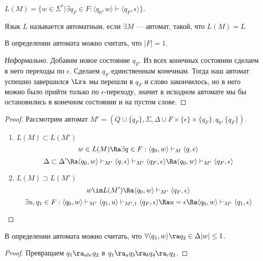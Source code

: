 \begin{definition}
    \(L(M) = \{w \in \Sigma^* | \exists q_F \in F: \langle q_0, w \rangle \vdash \langle q_F, \epsilon \rangle\}\).
\end{definition}

\begin{definition}
    Язык \(L\) называется автоматным, если \(\exists M\) --- автомат, такой, что \(L(M) = L\)
\end{definition}

\begin{proposition}
    В определении автомата можно считать, что \(|F| = 1\).
\end{proposition}
\begin{proof}[Неформально]
    Добавим новое состояние \(q_F\). Из всех конечных состоянии сделаем в него переходы по \(\epsilon\). Сделаем \(q_F\) единственным конечным. Тогда наш автомат успешно завершился \(\Lra\) мы перешли в \(q_F\) и слово закончилось, но в него можно было прийти только по \(\epsilon\)-переходу, значит в исходном автомате мы бы остановились в конечном состоянии и на пустом слове.
\end{proof}
\begin{proof}
    Рассмотрим автомат \(M' = (Q \cup \{q_F\}, \Sigma, \Delta \cup F \times \{\epsilon\} \times \{q_F\}, q_0, \{q_F\})\).
    \begin{enumerate}
        \item \(L(M) \subset L(M')\)
        \[w \in L(M) \Ra \exists q \in F: \langle q_0, w \rangle \vdash_M \langle q, \epsilon \rangle\]
        \[\Delta \subset \Delta' \Ra \langle q_0, w \rangle \vdash_{M'} \langle q, \epsilon \rangle \vdash_{M'} \langle q_F, \epsilon \rangle \Ra \langle q_0, w \rangle \vdash_{M'} \langle q_F, \epsilon \rangle\]
        \item \(L(M) \supset L(M')\)
        \[w \im L(M') \Ra \langle q_0, w\rangle \vdash_{M'} \langle q_F, \epsilon\rangle\]
        \[\exists u, q_1 \in F: \langle q_0, w\rangle \vdash_{M'} \langle q_1, u\rangle \vdash_{M', 1} \langle q_F, \epsilon\rangle \Ra u = \epsilon \Ra \langle q_0, w\rangle \vdash_{M'} \langle q_1, \epsilon\rangle\]
    \end{enumerate}
\end{proof}

\begin{proposition}
    В определении автомата можно считать, что \(\forall \langle q_1, w \rangle \ra q_2 \in \Delta |w| \le 1\).
\end{proposition}
\begin{proof}
    Превращаем \(q_1 \ra_{abc} q_2\) в \(q_1 \ra_a q_3 \ra_b q_4 \ra_c q_2\).
\end{proof}

